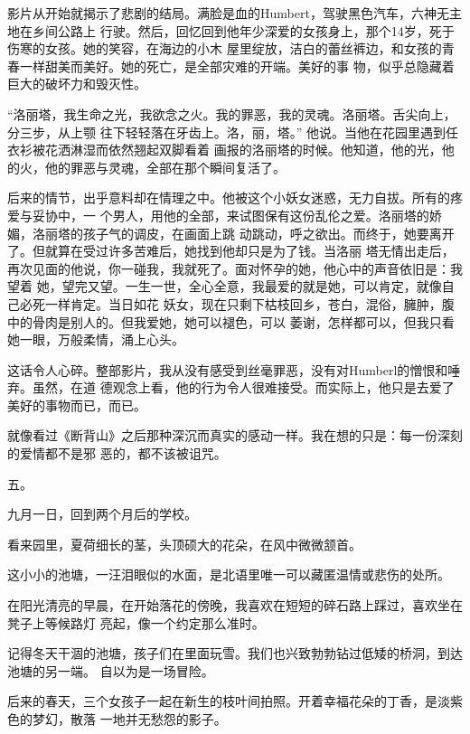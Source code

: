 \documentclass[12pt,a4paper]{article}
\newcommand{\subpart}[1]{
	\begingroup \par
	\vspace{1ex} \centering #1
	\par \endgroup \nopagebreak[4]
}
\begin{document}
		影片从开始就揭示了悲剧的结局。满脸是血的Humbert，驾驶黑色汽车，六神无主地在乡间公路上
	行驶。然后，回忆回到他年少深爱的女孩身上，那个14岁，死于伤寒的女孩。她的笑容，在海边的小木
	屋里绽放，洁白的蕾丝裤边，和女孩的青春一样甜美而美好。她的死亡，是全部灾难的开端。美好的事
	物，似乎总隐藏着巨大的破坏力和毁灭性。

		“洛丽塔，我生命之光，我欲念之火。我的罪恶，我的灵魂。洛丽塔。舌尖向上，分三步，从上颚
	往下轻轻落在牙齿上。洛，丽，塔。” 他说。当他在花园里遇到任衣衫被花洒淋湿而依然翘起双脚看着
	画报的洛丽塔的时候。他知道，他的光，他的火，他的罪恶与灵魂，全部在那个瞬间复活了。

		后来的情节，出乎意料却在情理之中。他被这个小妖女迷惑，无力自拔。所有的疼爱与妥协中，一
	个男人，用他的全部，来试图保有这份乱伦之爱。洛丽塔的娇媚，洛丽塔的孩子气的调皮，在画面上跳
	动跳动，呼之欲出。而终于，她要离开了。但就算在受过许多苦难后，她找到他却只是为了钱。当洛丽
	塔无情出走后，再次见面的他说，你一碰我，我就死了。面对怀孕的她，他心中的声音依旧是：我望着
	她，望完又望。一生一世，全心全意，我最爱的就是她，可以肯定，就像自己必死一样肯定。当日如花
	妖女，现在只剩下枯枝回乡，苍白，混俗，臃肿，腹中的骨肉是别人的。但我爱她，她可以褪色，可以
	萎谢，怎样都可以，但我只看她一眼，万般柔情，涌上心头。

		这话令人心碎。整部影片，我从没有感受到丝毫罪恶，没有对Humberl的憎恨和唾弃。虽然，在道
	德观念上看，他的行为令人很难接受。而实际上，他只是去爱了美好的事物而已，而已。

		就像看过《断背山》之后那种深沉而真实的感动一样。我在想的只是：每一份深刻的爱情都不是邪
	恶的，都不该被诅咒。

	\endwriting



		\subpart{五。}

		九月一日，回到两个月后的学校。

		看来园里，夏荷细长的茎，头顶硕大的花朵，在风中微微颔首。

		这小小的池塘，一汪泪眼似的水面，是北语里唯一可以藏匿温情或悲伤的处所。

		在阳光清亮的早晨，在开始落花的傍晚，我喜欢在短短的碎石路上踩过，喜欢坐在凳子上等候路灯
	亮起，像一个约定那么准时。

		记得冬天干涸的池塘，孩子们在里面玩雪。我们也兴致勃勃钻过低矮的桥洞，到达池塘的另一端。
	自以为是一场冒险。

		后来的春天，三个女孩子一起在新生的枝叶间拍照。开着幸福花朵的丁香，是淡紫色的梦幻，散落
	一地并无愁怨的影子。
\end{document}

